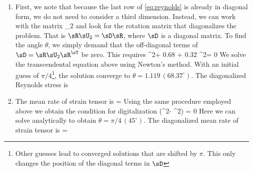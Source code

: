 \documentclass[11pt]{article}
\begin{document}
\begin{enumerate}[label=(\alph*)]
    \item First, we note that because the last row of \eqref{eq:reynolds} is already in diagonal form, we do not need to consider a third dimension. Instead, we can work with the matrix
        \beq
      \sU_2         \left[ \begin{matrix}
        1.08 & -0.32 \\
        -0.32 & 0.40 
\end{matrix} \right]\com
        \eeq
    and look for the rotation matrix
    \beq
    \sR {}
        \left[ \begin{matrix}
        \cos \theta & \sin \theta \\
        -\sin \theta & \cos \theta 
\end{matrix} \right]
    \eeq
    that diagonalizes the problem. That is $\sR \sU_2 = \sD \sR$, where $\sD$ is a diagonal matrix. To find the angle $\theta$, we simply demand that the off-diagonal terms of $\sD = \sR \sU_2 \sR^\sT$ be zero. This requires
     \cos^2\theta + 0.68 \cos\theta\sin\theta + 0.32 \sin^2\theta = 0\per
    \eeq
    We solve the transcendental equation above using Newton's method. With an initial guess of $\pi/4$\footnote{Other guesses lead to converged solutions that are shifted by $\pi$. This only changes the position of the diagonal terms in $\sD$}, the solution converge to $\theta = 1.119  \,(68.37^\circ)$. The diagonalized Reynolds stress is
    \beq
    \left[ \begin{matrix}
        0.23 & 0 & 0. \\
        0 & 1.21 & 0 \\
        0 & 0 & 0.52
\end{matrix} \right]\per            
    \eeq

    \item The mean rate of strain tensor is
        \beq
        \sS =  \left[ \begin{matrix}
        0 & \p U_1/\p x_2 & 0. \\
         \p U_1/\p x_2 & 0 & 0 \\
        0 & 0 & 0
\end{matrix} \right]
        \eeq
        Using the same procedure employed above we obtain the condition for digitalization
        \beq
            \left(\cos^2\theta - \sin^2\theta \right) = 0\per
        \eeq
        Here we can solve analytically to obtain $\theta= \pi/4 \, (45^\circ)$. The diagonalized mean rate of strain tensor is
        \beq
        \sS =  \left[ \begin{matrix}
        \p U_1/\p x_2 & 0 & 0. \\
         0 & -\p U_1/\p x_2 & 0 \\
            0 & 0 & 0 
\end{matrix} \right] \per
        \eeq



\end{enumerate}
\end{document}
